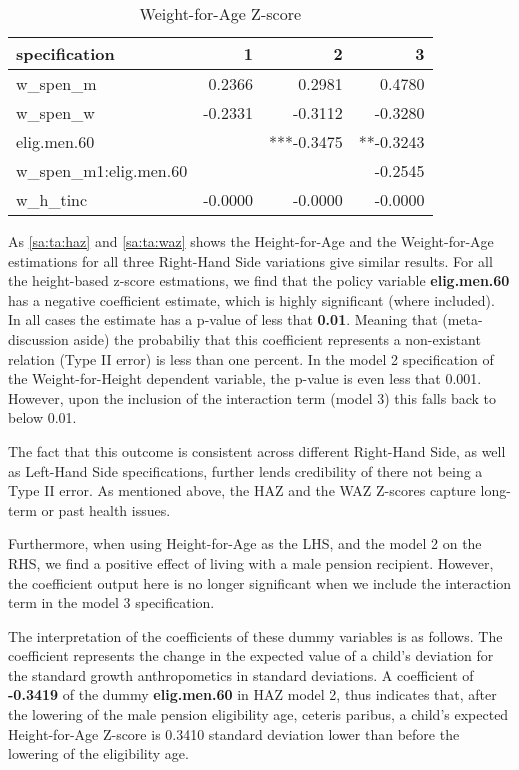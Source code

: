 \begin{refsection}
\begin{table}[!ht]
\centering
\caption{Weight-for-Age Z-score}
\label{sa:ta:waz}
\begin{tabular}{l|rrr}
\hline
specification & 1 & 2 & 3\\
\hline
w\_spen\_m & 0.2366 & 0.2981 & 0.4780 \\
w\_spen\_w & -0.2331 & -0.3112 & -0.3280 \\
elig.men.60 & & ***-0.3475 & **-0.3243 \\
w\_spen\_m1:elig.men.60 & & & -0.2545 \\
w\_h\_tinc & -0.0000 & -0.0000 & -0.0000 \\
\end{tabular}
\end{table}

As \autoref{sa:ta:haz} and \autoref{sa:ta:waz} shows the Height-for-Age and the Weight-for-Age estimations for all three Right-Hand Side variations give similar results.
For all the height-based z-score estmations, we find that the policy variable \textbf{elig.men.60} has a negative coefficient estimate, which is highly significant (where included).
In all cases the estimate has a p-value of less that \textbf{0.01}.
Meaning that (meta-discussion aside) the probabiliy that this coefficient represents a non-existant relation (Type II error) is less than one percent.
In the model 2 specification of the Weight-for-Height dependent variable, the p-value is even less that 0.001.
However, upon the inclusion of the interaction term (model 3) this falls back to below 0.01.

The fact that this outcome is consistent across different Right-Hand Side,
as well as Left-Hand Side specifications, further lends credibility of there not being a Type II error.
As mentioned above, the HAZ and the WAZ Z-scores capture long-term or past health issues.

Furthermore, when using Height-for-Age as the LHS, and the model 2 on the RHS,
we find a positive effect of living with a male pension recipient.
However, the coefficient output here is no longer significant when we include the interaction term in the model 3 specification.

The interpretation of the coefficients of these dummy variables is as follows.
The coefficient represents the change in the expected value of a child's deviation for the standard growth anthropometics in standard deviations. 
A coefficient of \textbf{-0.3419} of the dummy \textbf{elig.men.60} in HAZ model 2,  thus indicates that,
after the lowering of the male pension eligibility age, ceteris paribus, a child's expected Height-for-Age Z-score is 0.3410 standard deviation lower than before the lowering of the eligibility age.




\end{refsection}
